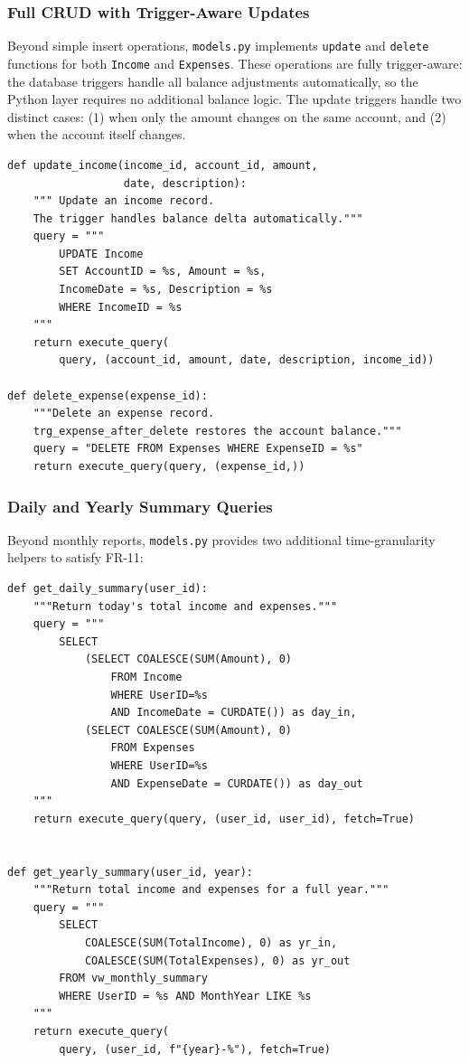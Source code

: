 \documentclass[12pt, a4paper]{article}
\begin{document}
\subsubsection{Full CRUD with Trigger-Aware Updates}

Beyond simple insert operations, \texttt{models.py} implements \texttt{update} and
\texttt{delete} functions for both \texttt{Income} and \texttt{Expenses}. These
operations are fully trigger-aware: the database triggers handle all balance
adjustments automatically, so the Python layer requires no additional balance logic.
The update triggers handle two distinct cases: (1) when only the amount changes on
the same account, and (2) when the account itself changes.

\begin{lstlisting}[style=pythonstyle, caption={update\_income and delete\_expense in models.py}]
def update_income(income_id, account_id, amount, 
                  date, description):
    """ Update an income record.
    The trigger handles balance delta automatically."""
    query = """
        UPDATE Income 
        SET AccountID = %s, Amount = %s, 
        IncomeDate = %s, Description = %s
        WHERE IncomeID = %s
    """
    return execute_query(
        query, (account_id, amount, date, description, income_id))

def delete_expense(expense_id):
    """Delete an expense record.
    trg_expense_after_delete restores the account balance."""
    query = "DELETE FROM Expenses WHERE ExpenseID = %s"
    return execute_query(query, (expense_id,))
\end{lstlisting}

\subsubsection{Daily and Yearly Summary Queries}

Beyond monthly reports, \texttt{models.py} provides two additional time-granularity
helpers to satisfy FR-11:

\begin{lstlisting}[style=pythonstyle, caption={Daily and yearly summary functions in models.py}]
def get_daily_summary(user_id):
    """Return today's total income and expenses."""
    query = """
        SELECT 
            (SELECT COALESCE(SUM(Amount), 0) 
                FROM Income 
                WHERE UserID=%s 
                AND IncomeDate = CURDATE()) as day_in,
            (SELECT COALESCE(SUM(Amount), 0) 
                FROM Expenses 
                WHERE UserID=%s 
                AND ExpenseDate = CURDATE()) as day_out
    """
    return execute_query(query, (user_id, user_id), fetch=True) 


def get_yearly_summary(user_id, year):
    """Return total income and expenses for a full year."""
    query = """
        SELECT 
            COALESCE(SUM(TotalIncome), 0) as yr_in, 
            COALESCE(SUM(TotalExpenses), 0) as yr_out 
        FROM vw_monthly_summary 
        WHERE UserID = %s AND MonthYear LIKE %s
    """
    return execute_query(
        query, (user_id, f"{year}-%"), fetch=True)
\end{lstlisting}
\end{document}
